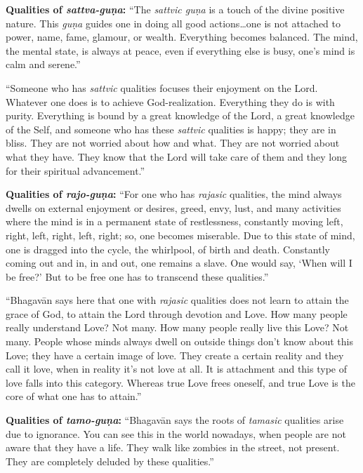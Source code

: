 \textbf{Qualities of \textit{sattva-guṇa}:} \enquote{The \textit{sattvic guṇa} is a touch of the divine positive nature. This \textit{guṇa} guides one in doing all good actions\ldots one is not attached to power, name, fame, glamour, or wealth. Everything becomes balanced. The mind, the mental state, is always at peace, even if everything else is busy, one’s mind is calm and serene.}

\enquote{Someone who has \textit{sattvic} qualities focuses their enjoyment on the Lord. Whatever one does is to achieve God-realization. Everything they do is with purity. Everything is bound by a great knowledge of the Lord, a great knowledge of the Self, and someone who has these \textit{sattvic} qualities is happy; they are in bliss. They are not worried about how and what. They are not worried about what they have. They know that the Lord will take care of them and they long for their spiritual advancement.}

\textbf{Qualities of \textit{rajo-guṇa}:} \enquote{For one who has \textit{rajasic} qualities, the mind always dwells on external enjoyment or desires, greed, envy, lust, and many activities where the mind is in a permanent state of restlessness, constantly moving left, right, left, right, left, right; so, one becomes miserable. Due to this state of mind, one is dragged into the cycle, the whirlpool, of birth and death. Constantly coming out and in, in and out, one remains a slave. One would say, \enquote{When will I be free?} But to be free one has to transcend these qualities.}

\enquote{Bhagavān says here that one with \textit{rajasic} qualities does not learn to attain the grace of God, to attain the Lord through devotion and Love. How many people really understand Love? Not many. How many people really live this Love? Not many. People whose minds always dwell on outside things don’t know about this Love; they have a certain image of love. They create a certain reality and they call it love, when in reality it’s not love at all. It is attachment and this type of love falls into this category. Whereas true Love frees oneself, and true Love is the core of what one has to attain.}

\textbf{Qualities of \textit{tamo-guṇa}:} \enquote{Bhagavān says the roots of \textit{tamasic} qualities arise due to ignorance. You can see this in the world nowadays, when people are not aware that they have a life. They walk like zombies in the street, not present. They are completely deluded by these qualities.}

